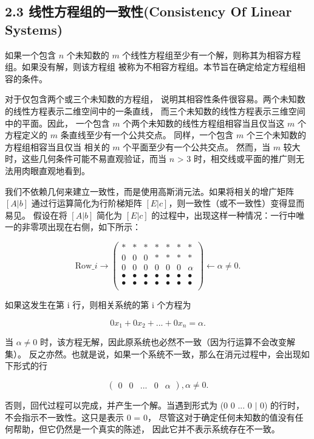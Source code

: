 \subsection*{2.3 线性方程组的一致性(Consistency Of Linear Systems)}

如果一个包含 \(n\) 个未知数的 \(m\) 个线性方程组至少有一个解，则称其为相容方程组。如果没有解，则该方程组
被称为不相容方程组。本节旨在确定给定方程组相容的条件。

对于仅包含两个或三个未知数的方程组，
说明其相容性条件很容易。两个未知数的线性方程表示二维空间中的一条直线，
而三个未知数的线性方程表示三维空间中的平面。因此，
一个包含 \(m\) 个两个未知数的线性方程组相容当且仅当这 \(m\) 个方程定义的 \(m\) 条直线至少有一个公共交点。
同样，一个包含 \(m\) 个三个未知数的方程组相容当且仅当
相关的 \(m\) 个平面至少有一个公共交点。
然而，当 \(m\) 较大时，这些几何条件可能不易直观验证，而当 \(n\) > 3 时，相交线或平面的推广则无法用肉眼直观地看到。

我们不依赖几何来建立一致性，而是使用高斯消元法。如果将相关的增广矩阵 \([A|b]\) 通过行运算简化为行阶梯矩阵 \([E|c]\)，则一致性（或不一致性）变得显而易见。
假设在将 \([A|b]\) 简化为 \([E|c]\) 的过程中，出现这样一种情况：一行中唯一的非零项出现在右侧，如下所示：

\[
\mathrm{Row}\_i \rightarrow 
\left(\begin{array}{cccccc|c}
* & * & * & * & * & * & * \\ 
0 & 0 & 0 & * & * & * & * \\ 
0 & 0 & 0 & 0 & 0 & 0 & \alpha \\
\bullet & \bullet & \bullet & \bullet & \bullet & \bullet & \bullet \\
\bullet & \bullet & \bullet & \bullet & \bullet & \bullet & \bullet \\
\end{array}\right)
\leftarrow \alpha \neq 0.
\]

如果这发生在第 i 行，则相关系统的第 i 个方程为

\[
0x_1 + 0x_2 + ... + 0x_n = \alpha.
\]

当 \(\alpha \neq 0\) 时，该方程无解，因此原系统也必然不一致（因为行运算不会改变解集）。
反之亦然。也就是说，如果一个系统不一致，那么在消元过程中，会出现如下形式的行

\[
\left(\begin{array}{cccccc|c}
0 & 0 & ... & 0 & \alpha
\end{array}\right), \alpha \neq 0.
\]

否则，回代过程可以完成，并产生一个解。当遇到形式为
(0 0 ... 0 \(\mid\) 0) 的行时，不会指示不一致性。这只是表示 0 = 0，
尽管这对于确定任何未知数的值没有任何帮助，但它仍然是一个真实的陈述，
因此它并不表示系统存在不一致。

